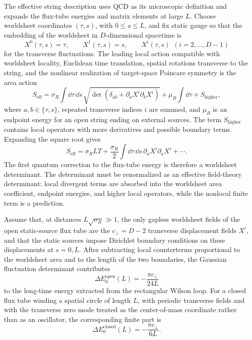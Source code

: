 The effective string description uses QCD as its microscopic definition and
expands the flux-tube energies and matrix elements at large \(L\).  Choose
worldsheet coordinates \((\tau,s)\), with
\(0\le s\le L\), and fix static gauge so that the embedding of the worldsheet
in \(D\)-dimensional spacetime is
\[
  X^0(\tau,s)=\tau,\qquad
  X^1(\tau,s)=s,\qquad
  X^i(\tau,s)\ \ (i=2,\ldots,D-1)
\]
for the transverse fluctuations.  The leading local action compatible with
worldsheet locality, Euclidean time translation, spatial rotations transverse
to the string, and the nonlinear realization of target-space Poincare symmetry
is the area action
\begin{equation}
  S_{\mathrm{eff}}
  =
  \sigma_R
  \int\dd\tau\,\dd s\,
  \sqrt{\det\!\left(\delta_{ab}
  +\partial_aX^i\partial_bX^i\right)}
  +\mu_R\int\dd\tau
  +S_{\mathrm{higher}},
  \label{eq:qcd-string-effective-action}
\end{equation}
where \(a,b\in\{\tau,s\}\), repeated transverse indices \(i\) are summed, and
\(\mu_R\) is an endpoint energy for an open string ending on external sources.
The term \(S_{\mathrm{higher}}\) contains local operators with more derivatives
and possible boundary terms.  Expanding the square root gives
\[
  S_{\mathrm{eff}}
  =
  \sigma_RLT
  +
  \frac{\sigma_R}{2}
  \int\dd\tau\,\dd s\,
  \partial_aX^i\partial_aX^i
  +\cdots .
\]
The first quantum correction to the flux-tube energy is therefore a
worldsheet determinant.  The determinant must be renormalized as an effective
field-theory determinant: local divergent terms are absorbed into the
worldsheet area coefficient, endpoint energies, and higher local operators,
while the nonlocal finite term is a prediction.

\begin{lemma}
\label{lem:qcd-string-luscher-term}
Assume that, at distances \(L\sqrt{\sigma_R}\gg1\), the only gapless
worldsheet fields of the open static-source flux tube are the
\(c_\perp=D-2\) transverse displacement fields \(X^i\), and that the static
sources impose Dirichlet boundary conditions on these displacements at
\(s=0,L\).  After subtracting local counterterms proportional to the
worldsheet area and to the length of the two boundaries, the Gaussian
fluctuation determinant contributes
\[
  \Delta E^{\mathrm{open}}_0(L)
  =
  -\frac{\pi c_\perp}{24L}
\]
to the long-time energy extracted from the rectangular Wilson loop.  For a
closed flux tube winding a spatial circle of length \(L\), with periodic
transverse fields and with the transverse zero mode treated as the
center-of-mass coordinate rather than as an oscillator, the corresponding
finite part is
\[
  \Delta E^{\mathrm{closed}}_0(L)
  =
  -\frac{\pi c_\perp}{6L}.
\]
\end{lemma}

